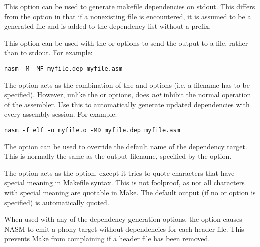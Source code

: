 
This option can be used to generate makefile dependencies on stdout.
This differs from the  option in that if a nonexisting file is
encountered, it is assumed to be a generated file and is added to the
dependency list without a prefix.


This option can be used with the  or  options
to send the output to a file, rather than to stdout. For example:

\begin{lstlisting}
nasm -M -MF myfile.dep myfile.asm
\end{lstlisting}


The  option acts as the combination of the 
and  options (i.e. a filename has to be specified).
However, unlike the  or  options, 
does \emph{not} inhibit the normal operation of the assembler.
Use this to automatically generate updated dependencies with
every assembly session. For example:

\begin{lstlisting}
nasm -f elf -o myfile.o -MD myfile.dep myfile.asm
\end{lstlisting}


The  option can be used to override the default name of the
dependency target. This is normally the same as the output filename,
specified by the  option.


The  option acts as the  option, except
it tries to quote characters that have special meaning in Makefile
syntax. This is not foolproof, as not all characters with special
meaning are quotable in Make. The default output (if no  or
 option is specified) is automatically quoted.


When used with any of the dependency generation options, the
 option causes NASM to emit a phony target without
dependencies for each header file. This prevents Make from
complaining if a header file has been removed.

